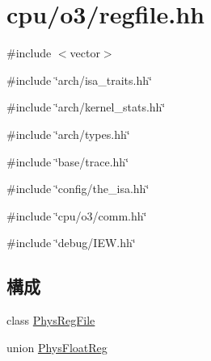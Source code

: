 \hypertarget{regfile_8hh}{
\section{cpu/o3/regfile.hh}
\label{regfile_8hh}
}
{\ttfamily \#include $<$vector$>$}\par
{\ttfamily \#include \char`\"{}arch/isa\_\-traits.hh\char`\"{}}\par
{\ttfamily \#include \char`\"{}arch/kernel\_\-stats.hh\char`\"{}}\par
{\ttfamily \#include \char`\"{}arch/types.hh\char`\"{}}\par
{\ttfamily \#include \char`\"{}base/trace.hh\char`\"{}}\par
{\ttfamily \#include \char`\"{}config/the\_\-isa.hh\char`\"{}}\par
{\ttfamily \#include \char`\"{}cpu/o3/comm.hh\char`\"{}}\par
{\ttfamily \#include \char`\"{}debug/IEW.hh\char`\"{}}\par
\subsection*{構成}
\begin{DoxyCompactItemize}
\item 
class \hyperlink{classPhysRegFile}{PhysRegFile}
\item 
union \hyperlink{unionPhysRegFile_1_1PhysFloatReg}{PhysFloatReg}
\end{DoxyCompactItemize}
